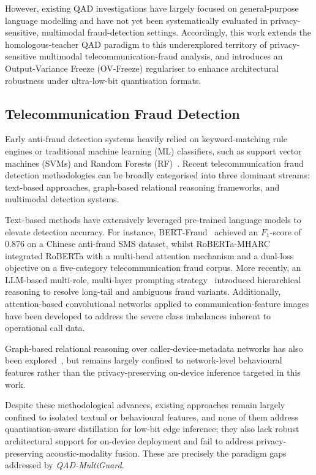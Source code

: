 \documentclass[a4paper,fleqn]{cas-sc}
\begin{document}
However, existing QAD investigations have largely focused on general-purpose language modelling and have not yet been systematically evaluated in privacy-sensitive, multimodal fraud-detection settings. Accordingly, this work extends the homologous-teacher QAD paradigm to this underexplored territory of privacy-sensitive multimodal telecommunication-fraud analysis, and introduces an Output-Variance Freeze (OV-Freeze) regulariser to enhance architectural robustness under ultra-low-bit quantisation formats.

\subsection{Telecommunication Fraud Detection}

Early anti-fraud detection systems heavily relied on keyword-matching rule engines or traditional machine learning (ML) classifiers, such as support vector machines (SVMs) and Random Forests (RF)~\citep{13,14,15}. Recent telecommunication fraud detection methodologies can be broadly categorised into three dominant streams: text-based approaches, graph-based relational reasoning frameworks, and multimodal detection systems.

Text-based methods have extensively leveraged pre-trained language models to elevate detection accuracy. For instance, BERT-Fraud~\citep{16} achieved an $F_1$-score of 0.876 on a Chinese anti-fraud SMS dataset, whilst RoBERTa-MHARC~\citep{liRobertaMHARC2024} integrated RoBERTa with a multi-head attention mechanism and a dual-loss objective on a five-category telecommunication fraud corpus. More recently, an LLM-based multi-role, multi-layer prompting strategy~\citep{mrml2026} introduced hierarchical reasoning to resolve long-tail and ambiguous fraud variants. Additionally, attention-based convolutional networks applied to communication-feature images~\citep{liImageCNN2025} have been developed to address the severe class imbalances inherent to operational call data.

Graph-based relational reasoning over caller-device-metadata networks has also been explored~\citep{papasavva2025,MotieESWA2024,RenESWA2024}, but remains largely confined to network-level behavioural features rather than the privacy-preserving on-device inference targeted in this work.

Despite these methodological advances, existing approaches remain largely confined to isolated textual or behavioural features, and none of them address quantisation-aware distillation for low-bit edge inference; they also lack robust architectural support for on-device deployment and fail to address privacy-preserving acoustic-modality fusion. These are precisely the paradigm gaps addressed by \textit{QAD-MultiGuard}.
\end{document}
